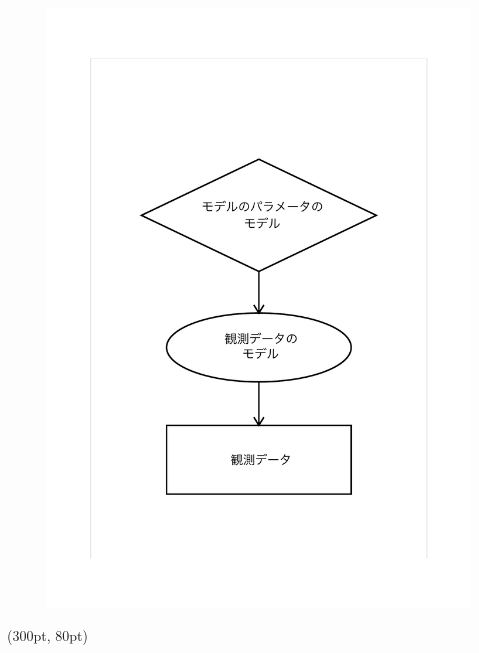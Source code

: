 \documentclass[aspectratio=169,unicode,dvipdfmx,14pt]{beamer}
\begin{document}
\begin{frame}
\begin{figure}[htbp]
\begin{center}
\vspace{-1.1in}
\includegraphics[scale=0.45]{bayesian_modeling.pdf}
\end{center}
\end{figure}
\begin{textblock*}{0.4\linewidth}(300pt, 80pt)
    \centering

\end{textblock*}
\end{frame}
\end{document}
